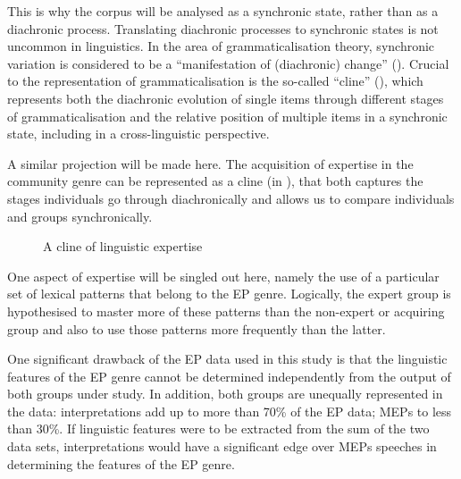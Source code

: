 \documentclass[output=paper]{langscibook}
\begin{document}
This is why the corpus will be analysed as a synchronic state, rather than as a diachronic process. Translating diachronic processes to synchronic states is not uncommon in linguistics. In the area of grammaticalisation theory, synchronic variation is considered to be a “manifestation of (diachronic) change” (\citealt{Lehmann2005}). Crucial to the representation of grammaticalisation is the so-called “cline” (\citealt{HopperTraugott2003}), which represents both the diachronic evolution of single items through different stages of grammaticalisation and the relative position of multiple items in a synchronic state, including in a cross-linguistic perspective. 

A similar projection will be made here. The acquisition of expertise in the community genre can be represented as a cline (in ), that both captures the stages individuals go through diachronically and allows us to compare individuals and groups synchronically.

\begin{figure}


\caption{A cline of linguistic expertise}
\label{fig:defrancq:2}
\end{figure}

One aspect of expertise will be singled out here, namely the use of a particular set of lexical patterns that belong to the EP genre. Logically, the expert group is hypothesised to master more of these patterns than the non-expert or acquiring group and also to use those patterns more frequently than the latter. 

One significant drawback of the EP data used in this study is that the linguistic features of the EP genre cannot be determined independently from the output of both groups under study. In addition, both groups are unequally represented in the data: interpretations add up to more than 70\% of the EP data; MEPs to less than 30\%. If linguistic features were to be extracted from the sum of the two data sets, interpretations would have a significant edge over MEPs speeches in determining the features of the EP genre. 
\end{document}
